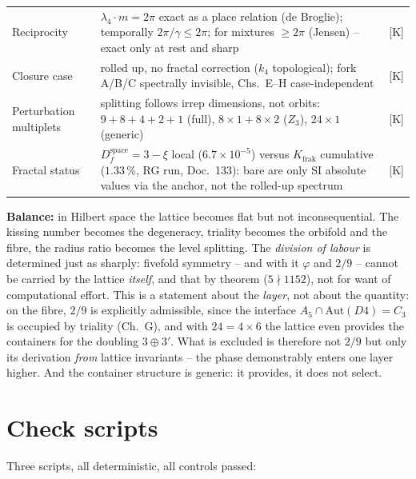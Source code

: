 \documentclass[11pt]{report}
\begin{document}
{\begin{longtable}{lp{6.4cm}l}
Reciprocity & $\lambda_4\cdot m = 2\pi$ exact as a place relation
  (de Broglie); temporally $2\pi/\gamma \le 2\pi$; for mixtures
  $\ge 2\pi$ (Jensen) -- exact only at rest and sharp & [K] \\
Closure case & rolled up, no fractal correction ($k_4$
  topological); fork A/B/C spectrally invisible, Chs.~E--H
  case-independent & [K] \\
Perturbation multiplets & splitting follows irrep dimensions, not
  orbits: $9{+}8{+}4{+}2{+}1$ (full), $8{\times}1{+}8{\times}2$
  ($Z_3$), $24{\times}1$ (generic) & [K] \\
Fractal status & $D_f^\text{space} = 3-\xi$ local
  ($6.7{\times}10^{-5}$) versus $K_\text{frak}$ cumulative
  ($1.33\,\%$, RG run, Doc.~133): bare are only SI absolute values
  via the anchor, not the rolled-up spectrum & [K] \\
\end{longtable}
}

\medskip
\noindent\textbf{Balance:} in Hilbert space the lattice becomes flat
but not inconsequential. The kissing number becomes the degeneracy,
triality becomes the orbifold and the fibre, the radius ratio
becomes the level splitting. The \emph{division of labour} is
determined just as sharply: fivefold symmetry -- and with it
$\varphi$ and $2/9$ -- cannot be carried by the lattice
\emph{itself}, and that by theorem ($5 \nmid 1152$), not for want
of computational effort. This is a statement about the
\emph{layer}, not about the quantity: on the fibre, $2/9$ is
explicitly admissible, since the interface
$A_5 \cap \text{Aut}(D4) = C_3$ is occupied by triality (Ch.~G),
and with $24 = 4\times6$ the lattice even provides the containers
for the doubling $3\oplus3'$. What is excluded is therefore not
$2/9$ but only its derivation \emph{from} lattice invariants --
the phase demonstrably enters one layer higher. And the container
structure is generic: it provides, it does not select.

\chapter{Check scripts}

Three scripts, all deterministic, all controls passed:
\end{document}
